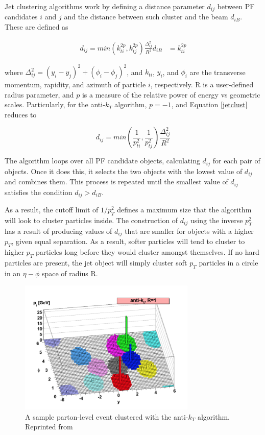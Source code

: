  Jet clustering algorithms work by defining a distance parameter $d_{ij}$ between PF candidates $i$ and $j$ and the distance between such cluster and the beam $d_{iB}$. These are defined as

 \begin{align}
 \label{jetclust}
 d_{ij} = min(k_{ti}^{2p},k_{tj}^{2p})\frac{\Delta_{ij}^{2}}{R^{2}}
 d_{iB} &= k_{ti}^{2p}
 \end{align}

where $\Delta_{ij}^{2} = (y_{i}-y_{j})^{2}+(\phi_{i}-\phi_{j})^{2}$, and $k_{ti}$, $y_{i}$, and $\phi_{i}$ are the transverse momentum, rapidity, and azimuth of particle $i$, respectively. R is a user-defined radius parameter, and $p$ is a measure of the relative power of energy vs geometric scales. Particularly, for the anti-$k_{T}$ algorithm, $p=-1$, and Equation \ref{jetclust} reduces to

\begin{equation}
d_{ij} = min(\frac{1}{p_{ti}^{2}},\frac{1}{p_{tj}^{2}})\frac{\Delta_{ij}^{2}}{R^{2}}
\end{equation}

The algorithm loops over all PF candidate objects, calculating $d_{ij}$ for each pair of objects. Once it does this, it selects the two objects with the lowest value of $d_{ij}$ and combines them. This process is repeated until the smallest value of $d_{ij}$ satisfies the condition $d_{ij}>d_{iB}$.

As a result, the cutoff limit of $1/p_{T}^{2}$ defines a maximum size that the algorithm will look to cluster particles inside. The construction of $d_{ij}$ using the inverse $p_{T}^{2}$ has a result of producing values of $d_{ij}$ that are smaller for objects with a higher $p_{T}$, given equal separation. As a result, softer particles will tend to cluster to higher $p_{T}$ particles long before they would cluster amongst themselves. If no hard particles are present, the jet object will simply cluster soft $p_{T}$ particles in a circle in an $\eta-\phi$ space of radius R.

\begin{figure}[h]
  	\label{fig:antikt}
 	\centering
 	\includegraphics[width=0.75\textwidth]{figures/antikt.png}
 	\singlespace
 	\caption{A sample parton-level event clustered with the anti-$k_{T}$ algorithm. Reprinted from \cite{Cacciari:2008gp}}
\end{figure}

